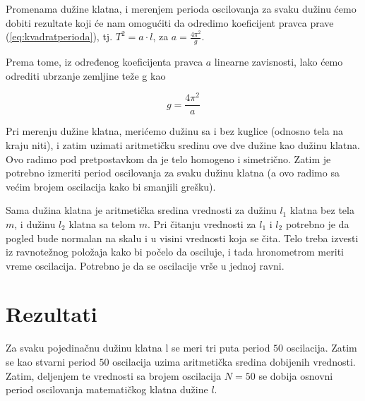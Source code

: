 Promenama dužine klatna, i merenjem perioda oscilovanja za svaku dužinu ćemo dobiti rezultate koji će nam omogućiti da odredimo koeficijent pravca prave (\ref{eq:kvadratperioda}), tj.
$T^2 = a \cdot l$, za $a = \frac{4 \pi^2}{g}$.

Prema tome, iz određenog koeficijenta pravca $a$ linearne zavisnosti, lako ćemo odrediti ubrzanje zemljine teže g kao

\begin{equation}
    \label{eq:gravitacija}
    g = \frac{4 \pi^2}{a}
\end{equation}

Pri merenju dužine klatna, merićemo dužinu sa i bez kuglice (odnosno tela na kraju niti), i zatim uzimati aritmetičku sredinu ove dve dužine kao dužinu klatna. Ovo radimo pod pretpostavkom da je telo homogeno i simetrično. Zatim je potrebno izmeriti period oscilovanja za svaku dužinu klatna (a ovo radimo sa većim brojem oscilacija kako bi smanjili grešku).

Sama dužina klatna je aritmetička sredina vrednosti za dužinu $l_1$ klatna bez tela $m$, i dužinu $l_2$ klatna sa telom $m$. Pri čitanju vrednosti za $l_1$ i $l_2$ potrebno je da pogled bude normalan na skalu i u visini vrednosti koja se čita. Telo treba izvesti iz ravnotežnog položaja kako bi počelo da osciluje, i tada hronometrom meriti vreme oscilacija. Potrebno je da se oscilacije vrše u jednoj ravni.

\section{Rezultati}

Za svaku pojedinačnu dužinu klatna l se meri tri puta period $50$ oscilacija. Zatim se kao stvarni period $50$ oscilacija uzima aritmetička sredina dobijenih vrednosti. Zatim, deljenjem te vrednosti sa brojem oscilacija $N = 50$ se dobija osnovni period oscilovanja matematičkog klatna dužine $l$.

